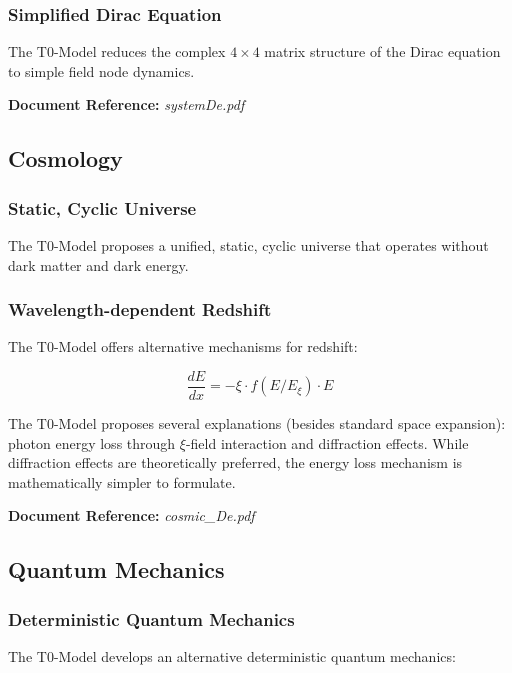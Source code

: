 \documentclass[12pt,a4paper]{article}
\newcommand{\xipar}{\xi}
\begin{document}
	\subsubsection{Simplified Dirac Equation}
	
	The T0-Model reduces the complex $4 \times 4$ matrix structure of the Dirac equation to simple field node dynamics.
	
	\textbf{Document Reference:} \textit{systemDe.pdf}
	
	\subsection{Cosmology}
	
	\subsubsection{Static, Cyclic Universe}
	
	The T0-Model proposes a unified, static, cyclic universe that operates without dark matter and dark energy.
	
	\subsubsection{Wavelength-dependent Redshift}
	
	The T0-Model offers alternative mechanisms for redshift:
	
	\begin{equation}
		\frac{dE}{dx} = -\xipar \cdot f(E/E_\xipar) \cdot E
	\end{equation}
	
	The T0-Model proposes several explanations (besides standard space expansion): photon energy loss through $\xipar$-field interaction and diffraction effects. While diffraction effects are theoretically preferred, the energy loss mechanism is mathematically simpler to formulate.
	
	\textbf{Document Reference:} \textit{cosmic\_De.pdf}
	
	\subsection{Quantum Mechanics}
	
	\subsubsection{Deterministic Quantum Mechanics}
	
	The T0-Model develops an alternative deterministic quantum mechanics:
	
\end{document}
